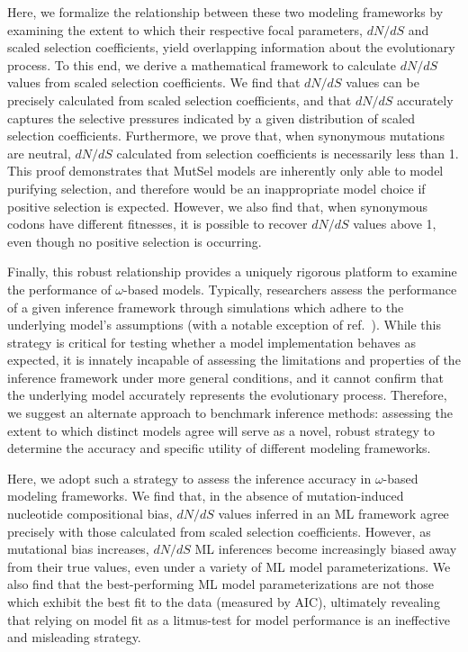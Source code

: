 \documentclass[11pt]{article}
\begin{document}
Here, we formalize the relationship between these two modeling frameworks by examining the extent to which their respective focal parameters, $dN/dS$ and scaled selection coefficients, yield overlapping information about the evolutionary process. To this end, we derive a mathematical framework to calculate $dN/dS$ values from scaled selection coefficients. We find that $dN/dS$ values can be precisely calculated from scaled selection coefficients, and that $dN/dS$ accurately captures the selective pressures indicated by a given distribution of scaled selection coefficients. Furthermore, we prove that, when synonymous mutations are neutral, $dN/dS$ calculated from selection coefficients is necessarily less than 1. This proof demonstrates that MutSel models are inherently only able to model purifying selection, and therefore would be an inappropriate model choice if positive selection is expected. However, we also find that, when synonymous codons have different fitnesses, it is possible to recover $dN/dS$ values above 1, even though no positive selection is occurring. 

Finally, this robust relationship provides a uniquely rigorous platform to examine the performance of $\omega$-based models. Typically, researchers assess the performance of a given inference framework through simulations which adhere to the underlying model's assumptions (with a notable exception of ref.\ \cite{Holder2008}). While this strategy is critical for testing whether a model implementation behaves as expected, it is innately incapable of assessing the limitations and properties of the inference framework under more general conditions, and it cannot confirm that the underlying model accurately represents the evolutionary process. Therefore, we suggest an alternate approach to benchmark inference methods: assessing the extent to which distinct models agree will serve as a novel, robust strategy to determine the accuracy and specific utility of different modeling frameworks. 

Here, we adopt such a strategy to assess the inference accuracy in $\omega$-based modeling frameworks. We find that, in the absence of mutation-induced nucleotide compositional bias, $dN/dS$ values inferred in an ML framework agree precisely with those calculated from scaled selection coefficients. However, as mutational bias increases, $dN/dS$ ML inferences become increasingly biased away from their true values, even under a variety of ML model parameterizations. We also find that the best-performing ML model parameterizations are not those which exhibit the best fit to the data (measured by AIC), ultimately revealing that relying on model fit as a litmus-test for model performance is an ineffective and misleading strategy. 
\end{document}
